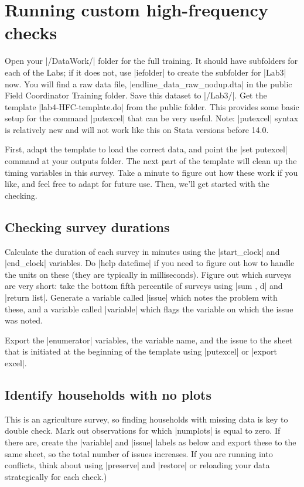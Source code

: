 \documentclass{tufte-handout}
\begin{document}
\section{Running custom high-frequency checks}

Open your |/DataWork/| folder for the full training.
It should have subfolders for each of the Labs;
if it does not, use |iefolder| to create the subfolder for |Lab3| now.
You will find a raw data file, |endline_data_raw_nodup.dta|
in the public Field Coordinator Training folder.
Save this dataset to |/Lab3/|.
Get the template |lab4-HFC-template.do| from the public folder.
This provides some basic setup for the command |putexcel| that can be very useful. Note: |putexcel| syntax is relatively new and will not work like this on Stata versions before 14.0.

First, adapt the template to load the correct data,
and point the |set putexcel| command at your outputs folder.
The next part of the template will clean up the timing variables in this survey.
Take a minute to figure out how these work if you like,
and feel free to adapt for future use.
Then, we’ll get started with the checking.

\subsection{Checking survey durations}
Calculate the duration of each survey in minutes
using the |start_clock| and |end_clock| variables.
Do |help datefime| if you need to figure out how to handle
the units on these (they are typically in milliseconds).
Figure out which surveys are very short:
take the bottom fifth percentile of surveys using |sum , d| and |return list|.
Generate a variable called |issue| which notes the problem with these,
and a variable called |variable| which flags the variable
on which the issue was noted.

Export the |enumerator| variables, the variable name, and the issue
to the sheet that is initiated at the beginning of the template
using |putexcel| or |export excel|.

\subsection{Identify households with no plots}
This is an agriculture survey, so finding households with missing data
is key to double check.
Mark out observations for which |numplots| is equal to zero.
If there are, create the |variable| and |issue| labels as below
and export these to the same sheet, so the total number of issues increases.
If you are running into conflicts,
think about using |preserve| and |restore|
or reloading your data strategically for each check.)
\end{document}

